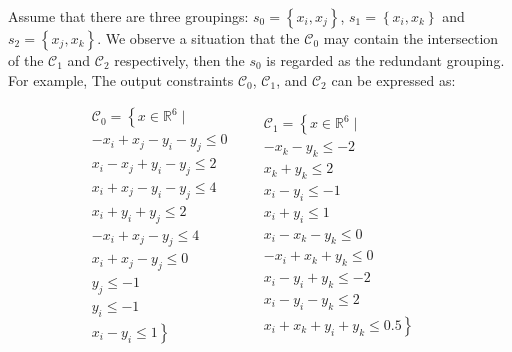 \documentclass[runningheads]{llncs}
\begin{document}
Assume that there are three groupings: $s_{0}=\left\{x_{i},x_{j} \right\}$, $s_{1}=\left\{x_{i},x_{k} \right\}$ and $s_{2}=\left\{x_{j},x_{k} \right\}$. We observe a situation that the $\mathcal{C}_{0}$ may contain the intersection of the $\mathcal{C}_{1}$ and $\mathcal{C}_{2}$ respectively, then the $s_{0}$ is regarded as the redundant grouping. For example,  The output constraints $\mathcal{C}_{0} $, $\mathcal{C}_{1}$, and $\mathcal{C}_{2} $ can be expressed as: 

\begin{equation*}
     \begin{aligned}
     &\mathcal{C}_{0}=\left\{x\in \mathbb{R}^{6}\mid \right. \\
                    &-x_{i}+x_{j}-y_{i}-y_{j} \leq 0 \\
                    &x_{i}-x_{j}+y_{i}-y_{j} \leq 2 \\
                    &x_{i}+x_{j}-y_{i}-y_{j} \leq 4\\ 
                    &x_{i}+y_{i}+y_{j} \leq 2\\ 
                    &-x_{i}+x_{j}-y_{j} \leq 4\\ 
                    &x_{i}+x_{j}-y_{j} \leq 0\\ 
                    &y_{j} \leq -1\\ 
                    &y_{i} \leq -1\\ 
                    &x_{i}-y_{i} \leq 1\left.\right\}
	\end{aligned}
     \quad
     \begin{aligned}
     &\mathcal{C}_{1}=\left\{x\in \mathbb{R}^{6}\mid \right. \\
                    &-x_{k}-y_{k} \leq -2 \\
                    &x_{k}+y_{k} \leq 2 \\
                    &x_{i}-y_{i} \leq -1\\ 
                    &x_{i}+y_{i} \leq 1\\                    
                    &x_{i}-x_{k}-y_{k} \leq 0\\ 
                    &-x_{i}+x_{k}+y_{k} \leq 0\\   
                    &x_{i}-y_{i}+y_{k} \leq -2\\
                    &x_{i}-y_{i}-y_{k} \leq 2\\ 
                    &x_{i}+x_{k}+y_{i}+y_{k} \leq 0.5\left.\right\}
	\end{aligned}
     \quad
     \begin{aligned}

\end{aligned}
\end{equation*}
\end{document}
